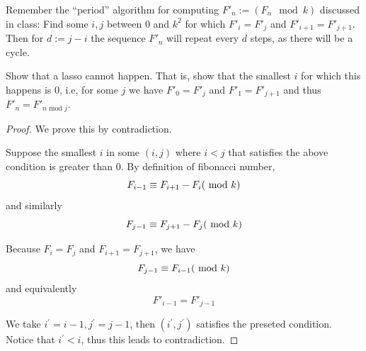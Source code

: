 \documentclass[11pt,a4paper,oneside]{article}
\begin{document}
\begin{problem}{6}
    \statement
    Remember the ``period'' algorithm for computing $F'_n := (F_n \mod k)$ discussed in class:
    Find some $i,j$ between $0$ and $k^2$ for which 
    $F'_{i} =  F'_{j}$ and $F'_{i+1} = F'_{j+1}$. 
    Then for $d := j-i$ the sequence $F'_{n}$ will repeat every $d$ steps, as there will be a cycle.
    
    Show that a lasso cannot happen. That is, show 
    that the smallest $i$ for which this happens is $0$, i.e, for some $j$ we have
    $F'_0 = F'_j$ and $F'_1 = F'_{j+1}$ and thus $F'_n = F'_{n \text{ mod }  j}$.
    \solution
	\begin{proof}
	We prove this by contradiction.

	Suppose the smallest $i$ in some $(i, j)$ where $i < j$ that satisfies the above condition is greater than $0$.
	By definition of fibonacci number,
	$$F_{i-1} \equiv  F_{i+1}-F_i(\textnormal{ mod }  k)$$
	and similarly
	$$F_{j-1} \equiv  F_{j+1}-F_j(\textnormal{ mod }  k)$$
	
	Because $F_i = F_j$ and $F_{i+1} = F_{j+1}$, we have 
	$$F_{j-1} \equiv F_{i-1}(\textnormal{ mod }  k)$$
	and equivalently
	$$F'_{i-1} = F'_{j-1}$$

	We take $i^\prime = i - 1, j^\prime = j - 1$, then $(i^\prime, j ^ \prime)$ satisfies the preseted condition. Notice that $i^\prime < i$, thus this leads to contradiction.
	\end{proof}
\end{problem}
\end{document}
